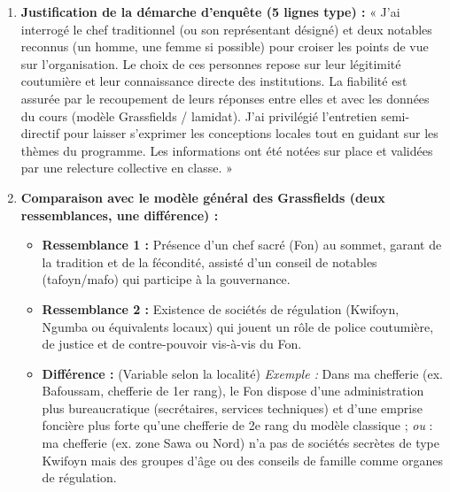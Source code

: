 \documentclass[11pt]{article}
\begin{document}
\begin{corrige}
\begin{enumerate}
\begin{center}
\end{center}
\textbf{Légende :} Flèches pleines = autorité descendante / délégation ; Flèches doubles = relations horizontales ; Flèches pointillées = remontée d'informations, tributs, légitimité. Adapter les noms des boîtes à la réalité locale (ex. « Lamido » au Nord, « Fon » à l'Ouest, « Chef de 3e degré » au Sud).

\item \textbf{Justification de la démarche d'enquête (5 lignes type) :}
« J'ai interrogé le chef traditionnel (ou son représentant désigné) et deux notables reconnus (un homme, une femme si possible) pour croiser les points de vue sur l'organisation. Le choix de ces personnes repose sur leur légitimité coutumière et leur connaissance directe des institutions. La fiabilité est assurée par le recoupement de leurs réponses entre elles et avec les données du cours (modèle Grassfields / lamidat). J'ai privilégié l'entretien semi-directif pour laisser s'exprimer les conceptions locales tout en guidant sur les thèmes du programme. Les informations ont été notées sur place et validées par une relecture collective en classe. »

\item \textbf{Comparaison avec le modèle général des Grassfields (deux ressemblances, une différence) :}
\begin{itemize}
\item \textbf{Ressemblance 1 :} Présence d'un chef sacré (Fon) au sommet, garant de la tradition et de la fécondité, assisté d'un conseil de notables (tafoyn/mafo) qui participe à la gouvernance.
\item \textbf{Ressemblance 2 :} Existence de sociétés de régulation (Kwifoyn, Ngumba ou équivalents locaux) qui jouent un rôle de police coutumière, de justice et de contre-pouvoir vis-à-vis du Fon.
\item \textbf{Différence :} (Variable selon la localité) \textit{Exemple :} Dans ma chefferie (ex. Bafoussam, chefferie de 1er rang), le Fon dispose d'une administration plus bureaucratique (secrétaires, services techniques) et d'une emprise foncière plus forte qu'une chefferie de 2e rang du modèle classique ; \textit{ou} : ma chefferie (ex. zone Sawa ou Nord) n'a pas de sociétés secrètes de type Kwifoyn mais des groupes d'âge ou des conseils de famille comme organes de régulation.
\end{itemize}
\end{enumerate}
\end{corrige}
\end{document}
